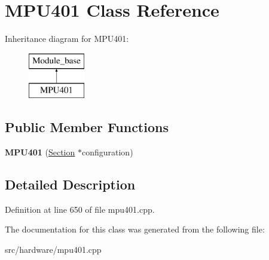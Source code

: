 \hypertarget{classMPU401}{\section{M\-P\-U401 Class Reference}
\label{classMPU401}
}
Inheritance diagram for M\-P\-U401\-:\begin{figure}[H]
\begin{center}
\leavevmode
\includegraphics[height=2.000000cm]{classMPU401}
\end{center}
\end{figure}
\subsection*{Public Member Functions}
\begin{DoxyCompactItemize}
\item 
\hypertarget{classMPU401_a7df40b93d9eb674d176f26e368af32f2}{{\bfseries M\-P\-U401} (\hyperlink{classSection}{Section} $\ast$configuration)}\label{classMPU401_a7df40b93d9eb674d176f26e368af32f2}

\end{DoxyCompactItemize}


\subsection{Detailed Description}


Definition at line 650 of file mpu401.\-cpp.



The documentation for this class was generated from the following file\-:\begin{DoxyCompactItemize}
\item 
src/hardware/mpu401.\-cpp\end{DoxyCompactItemize}
